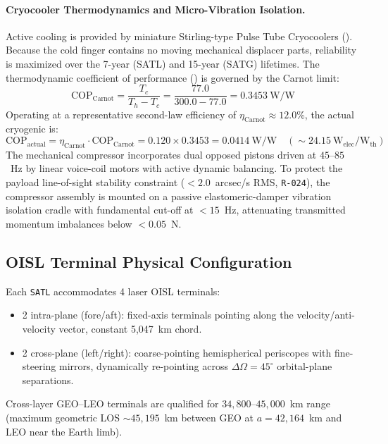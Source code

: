 \paragraph{Cryocooler Thermodynamics and Micro-Vibration Isolation.}
Active cooling is provided by miniature Stirling-type Pulse Tube Cryocoolers (). Because the cold finger contains no moving mechanical displacer parts, reliability is maximized over the 7-year (SATL) and 15-year (SATG) lifetimes.
The thermodynamic coefficient of performance () is governed by the Carnot limit:
\begin{equation}
    \text{COP}_{\text{Carnot}} = \frac{T_c}{T_h - T_c} = \frac{77.0}{300.0 - 77.0} = 0.3453~\text{W/W}
\end{equation}
Operating at a representative second-law efficiency of $\eta_{\text{Carnot}} \approx 12.0\%$, the actual cryogenic  is:
\begin{equation}
    \text{COP}_{\text{actual}} = \eta_{\text{Carnot}} \cdot \text{COP}_{\text{Carnot}} = 0.120 \times 0.3453 = 0.0414~\text{W/W} \quad (\sim 24.15~\text{W}_{\text{elec}}/\text{W}_{\text{th}})
\end{equation}
The mechanical compressor incorporates dual opposed pistons driven at $45\text{--}85$~Hz by linear voice-coil motors with active dynamic balancing. To protect the payload line-of-sight stability constraint ($< 2.0$~arcsec/s RMS, \texttt{R-024}), the compressor assembly is mounted on a passive elastomeric-damper vibration isolation cradle with fundamental cut-off at $< 15$~Hz, attenuating transmitted momentum imbalances below $< 0.05$~N.

\subsection{OISL Terminal Physical Configuration}

Each \texttt{SATL} accommodates 4 laser OISL terminals:
\begin{itemize}
    \item 2 intra-plane (fore/aft): fixed-axis terminals pointing along the velocity/anti-velocity vector, constant 5,047~km chord.
    \item 2 cross-plane (left/right): coarse-pointing hemispherical periscopes with fine-steering mirrors, dynamically re-pointing across $\Delta\Omega = 45^\circ$ orbital-plane separations.
\end{itemize}
Cross-layer GEO--LEO terminals are qualified for $34{,}800$--$45{,}000$~km range (maximum geometric LOS ${\sim}45{,}195$~km between GEO at $a = 42{,}164$~km and LEO near the Earth limb).


